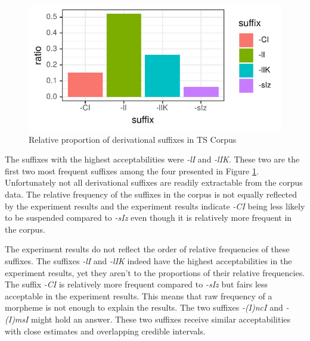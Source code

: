 \begin{knitrout}
\color{fgcolor}\begin{figure}[hbt!]

{\centering \includegraphics[]{experiments/acceptability/report/figure/suffixcorpus-1.pdf} 

}

\caption[Relative proportion of derivational suffixes in TS Corpus]{Relative proportion of derivational suffixes in TS Corpus}\label{fig:suffixcorpus}
\end{figure}


\end{knitrout}


The suffixes with the highest acceptabilities were \textit{-lI} and \textit{-lIK}. These two are the first two most frequent suffixes among the four presented in Figure \ref{fig:suffixcorpus}. Unfortunately not all derivational suffixes are readily extractable from the corpus data. The relative frequency of the suffixes in the corpus is not equally reflected by the experiment results and the experiment results indicate \textit{-CI} being less likely to be suspended compared to \textit{-sIz} even though it is relatively more frequent in the corpus.

The experiment results do not reflect the order of relative frequencies of these suffixes. The suffixes \textit{-lI} and \textit{-lIK} indeed have the highest acceptabilities in the experiment results, yet they aren't to the proportions of their relative frequencies. The suffix \textit{-CI} is relatively more frequent compared to \textit{-sIz} but fairs less acceptable in the experiment results. This means that raw frequency of a morpheme is not enough to explain the results. The two suffixes \textit{-(I)ncI} and \textit{-(I)msI} might hold an answer. These two suffixes receive similar acceptabilities with close estimates and overlapping credible intervals. 

